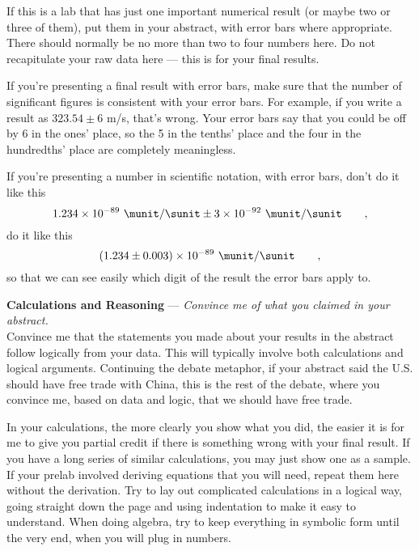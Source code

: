If this is a lab that has just one important numerical result (or
maybe two or three of them), put them
in your abstract, with error
bars where appropriate. There should normally be no more
than two to four numbers here. Do not recapitulate your raw
data here --- this is for your final results.

If you're presenting a final result with error bars, make sure that
the number of significant figures is consistent with your error bars.
For example, if you write a result as $323.54\pm6$ m/s, that's wrong.
Your error bars say that you could be off by 6 in the ones' place, so the
5 in the tenths' place and the four in the hundredths' place are
completely meaningless.

If you're presenting a number in scientific notation, with error bars,
don't do it like this
\begin{equation*}
  1.234 \times 10^{-89}\ \munit/\sunit \pm 3 \times 10^{-92}\ \munit/\sunit \qquad ,
\end{equation*}
do it like this
\begin{equation*}
  (1.234 \pm 0.003)\times 10^{-89}\ \munit/\sunit \qquad ,
\end{equation*}
so that we can see easily which digit of the result the error bars apply
to.

\textbf{Calculations and Reasoning}  --- \emph{Convince me of
what you claimed in your abstract.}\\
Convince me that the statements you made
about your results in the abstract follow logically from
your data. This will typically involve both calculations and
logical arguments. Continuing the debate meta\-phor, if your abstract
said the U.S. should have free trade with China, this is the rest
of the debate, where you convince me, based on data and logic,
that we should have free trade.

In your calculations, the more clearly you
show what you did, the easier it is for me to give you
partial credit if there is something wrong with your final
result. If you have a long series of similar calculations,
you may just show one as a sample. If your prelab involved
deriving equations that you will need, repeat them here
without the derivation. Try to lay out complicated
calculations in a logical way, going straight down the page
and using indentation to make it easy to understand. When
doing algebra, try to keep everything in symbolic form until
the very end, when you will plug in numbers.




